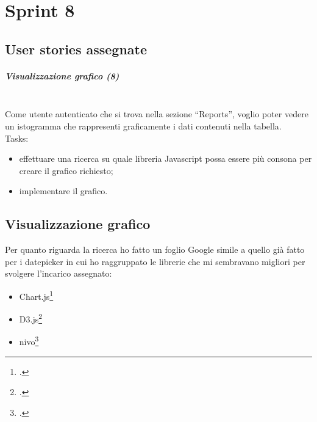 
\chapter{Sprint 8}
\label{cap:sprint8}

\section{User stories assegnate}
\paragraph{Visualizzazione grafico (8)} \mbox{} \\[\baselineskip]
Come utente autenticato che si trova nella sezione “Reports”, voglio poter vedere un istogramma che rappresenti graficamente i dati contenuti nella tabella.\\

\noindent Tasks:
\begin{itemize}
  \item effettuare una ricerca su quale libreria Javascript possa essere più consona per creare il grafico richiesto;
  \item implementare il grafico.
\end{itemize}

\section{Visualizzazione grafico}
Per quanto riguarda la ricerca ho fatto un foglio Google simile a quello già fatto per i datepicker in cui ho raggruppato le librerie che mi sembravano migliori per svolgere l'incarico assegnato:

\begin{itemize}
  \item Chart.js\footcite{site:chartjs}
  \item D3.js\footcite{site:d3}
  \item nivo\footcite{site:nivo}
\end{itemize}

